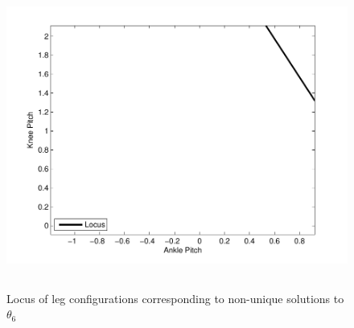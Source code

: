 \begin{figure}[!h]
	\begin{center}
		\includegraphics[height = 10cm]{Figures/locus.pdf}
 		\caption{Locus of leg configurations corresponding to non-unique solutions to $\theta_6$}
 		\label{fig:unlocus}
	\end{center}
\end{figure}

